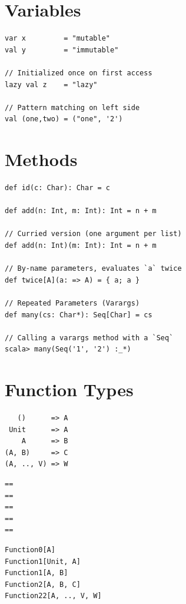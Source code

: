 \documentclass[10pt,landscape,a4paper]{article}
\begin{document}

\small
\begin{multicols*}{4}
  \section{Variables}
  \begin{verbatim}
var x         = "mutable"
val y         = "immutable"

// Initialized once on first access
lazy val z    = "lazy"

// Pattern matching on left side
val (one,two) = ("one", '2')
\end{verbatim}

\section{Methods}
\begin{verbatim}
def id(c: Char): Char = c

def add(n: Int, m: Int): Int = n + m

// Curried version (one argument per list)
def add(n: Int)(m: Int): Int = n + m

// By-name parameters, evaluates `a` twice
def twice[A](a: => A) = { a; a }

// Repeated Parameters (Varargs)
def many(cs: Char*): Seq[Char] = cs

// Calling a varargs method with a `Seq`
scala> many(Seq('1', '2') :_*)
\end{verbatim}

\section{Function Types}
\begin{center}
\begin{minipage}{0.37\linewidth}
\begin{verbatim}
   ()      => A
 Unit      => A
    A      => B
(A, B)     => C
(A, .., V) => W
\end{verbatim}
\end{minipage}
\begin{minipage}{0.09\linewidth}
  \begin{verbatim}
==
==
==
==
==
  \end{verbatim}
\end{minipage}
\begin{minipage}{0.50\linewidth}
\begin{verbatim}
Function0[A]
Function1[Unit, A]
Function1[A, B]
Function2[A, B, C]
Function22[A, .., V, W]
\end{verbatim}
\end{minipage}
\end{center}

\end{multicols*}
\end{document}

